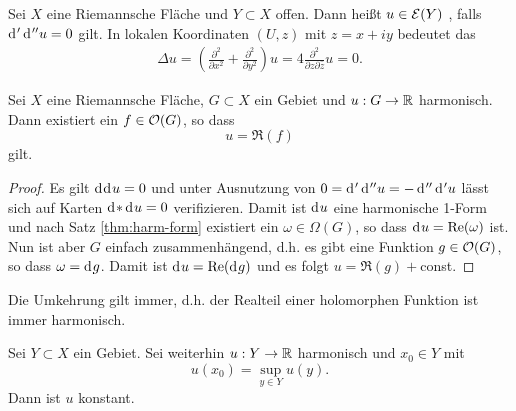 \begin{defin}
  Sei $X$ eine Riemannsche Fläche und $Y \subset X$ offen. Dann heißt
  $u \in \mathcal{E}(Y)$ , falls $\d['\d[''u]] = 0$ gilt.
  In lokalen Koordinaten $(U,z)$ mit $z = x + iy$ bedeutet das
  \begin{align*}
    \Delta u = \left ( \frac{\partial^2}{\partial x^2} +
      \frac{\partial^2}{\partial y^2} \right ) u = 4
    \frac{\partial^2}{\partial z \partial \bar z} u = 0.
  \end{align*}
\end{defin}

\begin{prop}
  \label{prop:harm-realteil-hol}
  Sei $X$ eine Riemannsche Fläche, $G \subset X$ ein Gebiet
  und $u: G \rightarrow \mathbb{R}$ harmonisch. Dann existiert ein $f \in \mathcal{O}(G)$, so dass
  \[
  u = \Re(f)
  \]
  gilt.
\end{prop}

\begin{proof}
  Es gilt $\d[\d[u]] = 0$ und unter Ausnutzung von $0 = \d['\d['' u]]
  = - \d[''\d['u]]$ lässt sich auf Karten $\d[\ast\d[u]] = 0$
  verifizieren. Damit ist $\d[u]$ eine harmonische 1-Form und nach
  Satz \ref{thm:harm-form} existiert ein $\omega \in \Omega(G)$, so dass $\d[u] =
  \Re(\omega)$ ist. Nun ist aber $G$ einfach zusammenhängend, d.h. es gibt
  eine Funktion $g \in \mathcal{O}(G)$, so dass $\omega = \d[g]$. Damit ist
  $\d[u] = \Re(\d[g])$ und es folgt $u = \Re(g) +$const.
\end{proof}

\begin{rem}
  Die Umkehrung gilt immer, d.h. der Realteil einer holomorphen
  Funktion ist immer harmonisch.
\end{rem}

\begin{prop}
  \label{prop:max-prinzip-harm}
  Sei $Y \subset X$ ein Gebiet. Sei weiterhin $u: Y \rightarrow \mathbb{R}$ harmonisch
  und $x_0 \in Y$ mit
  \[
  u(x_0) = \sup_{y \in Y} u(y).
  \]
  Dann ist $u$ konstant.
\end{prop}

